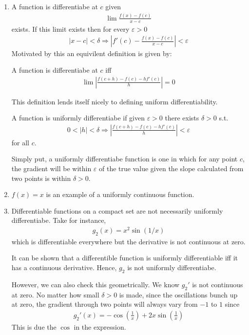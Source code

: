 \begin{enumerate}[label=(\alph*)]
    \item 
    A function is differentiabe at $c$ given 
    \begin{align*}
        \lim \frac{f(x)-f(c)}{x-c}
    \end{align*}
    exists. If this limit exists then for every $\varepsilon>0$
    \begin{align*}
        |x-c|<\delta \Rightarrow |f'(c)-\frac{f(x)-f(c)}{x-c}| <\varepsilon
    \end{align*}
    Motivated by this an equivilent definition is given by:
    \begin{definition}
        A function is differentiabe at $c$ iff 
        \begin{align*}
            \lim |\frac{f(c+h)-f(c)-h f'(c)}{h}|=0
        \end{align*}
    \end{definition}
    This definition lends itself nicely to defining 
    uniform differentiability.
    \begin{definition}
        A function is uniformly differentiabe if given 
        $\varepsilon>0$ there exists $\delta>0$ s.t. 
        \begin{align*}
            0<|h|<\delta \Rightarrow |\frac{f(c+h)-f(c)-h f'(c)}{h}|<\varepsilon
        \end{align*}
        for all $c$.
    \end{definition}

    Simply put, a uniformly differentiabe function is one in which
    for any point $c$, the 
    gradient will be within $\varepsilon$ of the true value 
    given the slope calculated from two points is within $\delta>0$.

    \item
    $f(x)=x$ is an example of a uniformly continuous function.

    \item
    Differentiable functions on a compact set are not necessarily 
    uniformly differentiabe. Take for instance,
    \begin{align*}
        g_2(x) = x^2 \sin(1/x)
    \end{align*}
    which is differentiable everywhere but the derivative is 
    not continuous at zero. 

    It can be shown that  a differentible function is uniformly differentiable iff
    it has a continuous derivative. Hence, $g_2$ is not uniformly differentiabe.
    
    However, we can also check this geometrically.
    We know $g_2'$ is not continuous at zero. No matter 
    how small $\delta>0$ is made, since the oscillations bunch 
    up at zero, the gradient through two points will always 
    vary from $-1$ to $1$ since 
    \begin{align*}
        g_2'(x)=-\cos\left(\frac{1}{x}\right) + 2x\sin\left(\frac{1}{x}\right)
    \end{align*} 
    This is due the $\cos$ in the expression.
\end{enumerate}

